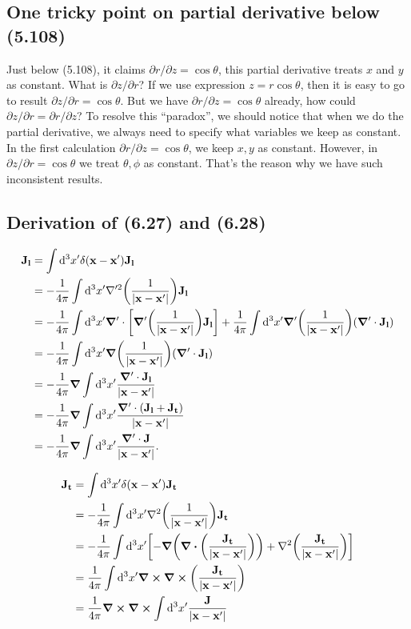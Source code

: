 \documentclass[10pt]{article}
\begin{document}
\subsection{One tricky point on partial derivative below (5.108)}

Just below (5.108), it claims $\partial r / \partial z = \cos{\theta}$, this partial derivative treats $x$ and $y$ as constant. What is $\partial z / \partial r$? If we use expression $z = r \cos{\theta}$, then it is easy to go to result $\partial z / \partial r = \cos{\theta}$. But we have $\partial r / \partial z = \cos{\theta}$ already, how could $\partial z / \partial r = \partial r / \partial z$?
To resolve this ``paradox'', we should notice that when we do the partial derivative, we always need to specify what variables we keep as constant. In the first calculation $\partial r / \partial z = \cos{\theta}$, we keep $x, y$ as constant. However, in $\partial z / \partial r = \cos{\theta}$ we treat $\theta, \phi$ as constant. That's the reason why we have such inconsistent results.

\subsection{Derivation of (6.27) and (6.28)}

\begin{align*}
	\vb{J_l} &= \int \dd^3{x'} \delta(\vb{x} -\vb{x'}) \vb{J_l} \\
	&= - \frac{1}{4\pi} \int \dd^3{x'} \nabla'^2\qty(\frac{1}{\abs{\vb{x}-\vb{x'}}}) \vb{J_l} \\
	&= - \frac{1}{4\pi} \int \dd^3{x'} \grad' \cdot \qty[\grad'\qty(\frac{1}{\abs{\vb{x}-\vb{x'}}}) \vb{J_l}] + \frac{1}{4\pi} \int \dd^3{x'} \grad'\qty(\frac{1}{\abs{\vb{x}-\vb{x'}}}) (\grad' \cdot \vb{J_l}) \\
	&= - \frac{1}{4\pi} \int \dd^3{x'} \grad \qty(\frac{1}{\abs{\vb{x}-\vb{x'}}}) (\grad' \cdot \vb{J_l}) \\
	&= - \frac{1}{4\pi} \grad \int \dd^3{x'} \frac{\grad' \cdot \vb{J_l}}{\abs{\vb{x}-\vb{x'}}} \\
	&= - \frac{1}{4\pi} \grad \int \dd^3{x'} \frac{\grad' \cdot (\vb{J_l} + \vb{J_t})}{\abs{\vb{x}-\vb{x'}}} \\
	&= - \frac{1}{4\pi} \grad \int \dd^3{x'} \frac{\grad' \cdot \vb{J}}{\abs{\vb{x}-\vb{x'}}}.
\end{align*}

\begin{align*}
	\vb{J_t} &= \int \dd^3{x'} \delta(\vb{x} -\vb{x'}) \vb{J_t} \\
	&= - \frac{1}{4\pi} \int \dd^3{x'} \nabla^2\qty(\frac{1}{\abs{\vb{x}-\vb{x'}}}) \vb{J_t} \\
	&= - \frac{1}{4\pi} \int \dd^3{x'} \qty[- \grad(\div(\frac{\vb{J_t}}{\abs{\vb{x}-\vb{x'}}})) + \laplacian(\frac{\vb{J_t}}{\abs{\vb{x}-\vb{x'}}})] \\
	&= \frac{1}{4\pi} \int \dd^3{x'} \curl \curl(\frac{\vb{J_t}}{\abs{\vb{x}-\vb{x'}}}) \\
	&= \frac{1}{4\pi} \curl \curl \int \dd^3{x'} \frac{\vb{J}}{\abs{\vb{x}-\vb{x'}}}
\end{align*}
\end{document}
